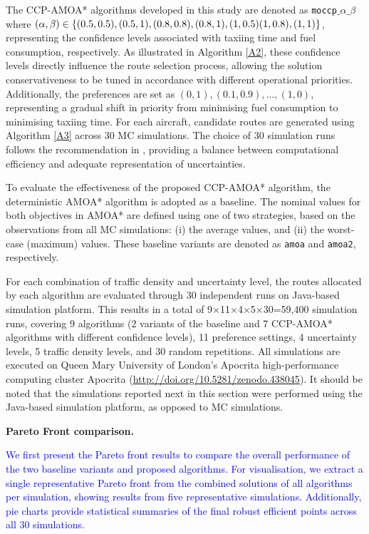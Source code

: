 \documentclass{article}
\newcommand*{\blue}{\textcolor{blue}}
\begin{document}
The CCP-AMOA* algorithms developed in this study are denoted as \texttt{moccp}$\_\alpha\_\beta$ where $(\alpha, \beta) \in \{(0.5,0.5),\\ (0.5,1),(0.8,0.8),(0.8,1),(1,0.5)(1,0.8),(1,1)\}$, representing the confidence levels associated with taxiing time and fuel consumption, respectively. As illustrated in Algorithm \ref{A2}, these confidence levels directly influence the route selection process, allowing the solution conservativeness to be tuned in accordance with different operational priorities. Additionally, the preferences are set as $(0,1), (0.1,0.9), \ldots, (1,0)$, representing a gradual shift in priority from minimising fuel consumption to minimising taxiing time. For each aircraft, candidate routes are generated using Algorithm \ref{A3} across 30 MC simulations. The choice of 30 simulation runs follows the recommendation in \cite{wang2021chance}, providing a balance between computational efficiency and adequate representation of uncertainties.

To evaluate the effectiveness of the proposed CCP-AMOA* algorithm, the deterministic AMOA* algorithm is adopted as a baseline. The nominal values for both objectives in AMOA* are defined using one of two strategies, based on the observations from all MC simulations: (i) the average values, and (ii) the worst-case (maximum) values. These baseline variants are denoted as \texttt{amoa} and \texttt{amoa2}, respectively.

For each combination of traffic density and uncertainty level, the routes allocated by each algorithm are evaluated through 30 independent runs on Java-based simulation platform. This results in a total of 
9×11×4×5×30=59,400 simulation runs, covering 9 algorithms (2 variants of the baseline and 7 CCP-AMOA* algorithms with different confidence levels), 11 preference settings, 4 uncertainty levels, 5 traffic density levels, and 30 random repetitions. All simulations are executed on Queen Mary University of London's Apocrita high-performance computing cluster Apocrita (\url{http://doi.org/10.5281/zenodo.438045}). It should be noted that the simulations reported next in this section were performed using the Java-based simulation platform, as opposed to MC simulations. 

\vspace{0.5em}
\textbf{Pareto Front comparison.}
\vspace{0.5em}

\blue{We first present the Pareto front results to compare the overall performance of the two baseline variants and proposed algorithms. For visualisation, we extract a single representative Pareto front from the combined solutions of all algorithms per simulation, showing results from five representative simulations. Additionally, pie charts provide statistical summaries of the final robust efficient points across all 30 simulations.}
\end{document}
